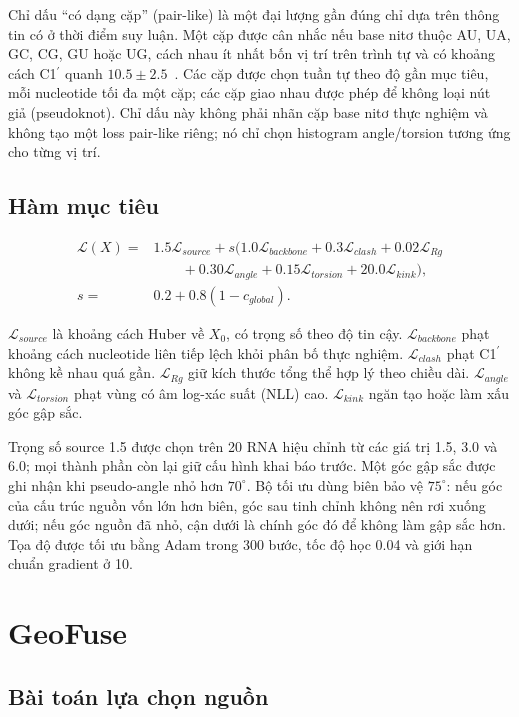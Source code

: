 \documentclass[12pt,a4paper,oneside]{report}
\newcommand{\cprime}{C1$^{\prime}$}
\newcommand{\angstrom}{\text{\AA}}
\begin{document}
Chỉ dấu ``có dạng cặp'' (pair-like) là một đại lượng gần đúng chỉ dựa trên thông tin có
ở thời điểm suy luận. Một cặp được cân nhắc nếu base nitơ thuộc AU, UA, GC, CG, GU hoặc
UG, cách nhau ít nhất bốn vị
trí trên trình tự và có khoảng cách \cprime{} quanh
$10.5\pm2.5$~\angstrom. Các cặp được chọn tuần tự theo độ gần mục tiêu, mỗi nucleotide
tối đa một cặp; các cặp giao nhau được phép để không loại nút giả (pseudoknot). Chỉ dấu
này không phải nhãn cặp base nitơ thực nghiệm và không tạo một loss pair-like riêng;
nó chỉ chọn histogram angle/torsion tương ứng cho từng vị trí.

\subsection{Hàm mục tiêu}

\begin{align}
\mathcal{L}(X)={}&1.5\mathcal{L}_{source}
+s\big(1.0\mathcal{L}_{backbone}
+0.3\mathcal{L}_{clash}
+0.02\mathcal{L}_{Rg}\nonumber\\
&\qquad +0.30\mathcal{L}_{angle}
+0.15\mathcal{L}_{torsion}
+20.0\mathcal{L}_{kink}\big),\\
s={}&0.2+0.8(1-c_{global}).
\end{align}

$\mathcal{L}_{source}$ là khoảng cách Huber về $X_0$, có trọng số theo độ tin cậy.
$\mathcal{L}_{backbone}$ phạt khoảng cách nucleotide liên tiếp lệch khỏi phân bố thực nghiệm.
$\mathcal{L}_{clash}$ phạt \cprime{} không kề nhau quá gần.
$\mathcal{L}_{Rg}$ giữ kích thước tổng thể hợp lý theo chiều dài.
$\mathcal{L}_{angle}$ và $\mathcal{L}_{torsion}$ phạt vùng có âm log-xác suất (NLL) cao.
$\mathcal{L}_{kink}$ ngăn tạo hoặc làm xấu góc gập sắc.

Trọng số source 1.5 được chọn trên 20 RNA hiệu chỉnh từ các giá trị 1.5, 3.0 và 6.0;
mọi thành phần còn lại giữ cấu hình khai báo trước. Một góc gập sắc được ghi nhận khi pseudo-angle nhỏ hơn $70^\circ$. Bộ tối ưu dùng biên
bảo vệ $75^\circ$: nếu góc của cấu trúc nguồn vốn lớn hơn biên, góc sau tinh chỉnh không
nên rơi xuống dưới; nếu góc nguồn đã nhỏ, cận dưới là chính góc đó để không làm gập sắc
hơn. Tọa độ được tối ưu bằng Adam trong 300 bước, tốc độ học 0.04 và giới hạn chuẩn
gradient ở 10.

\iffalse
\section{GeoFuse}

\subsection{Bài toán lựa chọn nguồn}
\end{document}
